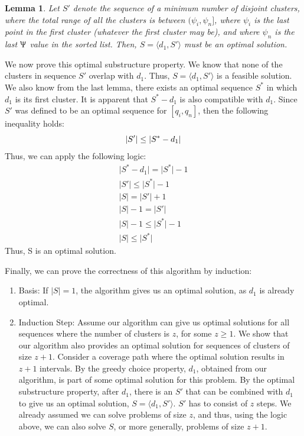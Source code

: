 \documentclass[conference]{IEEEtran}
\theoremstyle{plain}%
\newtheorem{lemma}{Lemma}
\begin{document}
\begin{lemma} %
Let $S'$ denote the sequence of a minimum number of disjoint clusters, where the total range of all the clusters is between $(\psi_i, \psi_n]$, where $\psi_i$ is the last point in the first cluster (whatever the first cluster may be), and where $\psi_n$ is the last $\Uppsi$ value in the sorted list. Then, $S = \langle d_1, S' \rangle$ must be an optimal solution.
\end{lemma}
We now prove this optimal substructure property. We know that none of the clusters in sequence $S'$ overlap with $d_1$. Thus, $S = \langle d_1, S' \rangle$ is a feasible solution. We also know from the last lemma, there exists an optimal sequence $S^*$ in which $d_1$ is its first cluster. It is apparent that $S^* - d_1$ is also compatible with $d_1$. Since $S'$ was defined to be an optimal sequence for $[q_i, q_n]$, then the following inequality holds:
\begin{equation*}
\lvert S' \rvert \leq \lvert S^* - d_1 \rvert \\
\end{equation*}
Thus, we can apply the following logic:
\begin{gather*}
\lvert S^* - d_1 \rvert = \lvert S^* \rvert -1 \\
\lvert S' \rvert \leq \lvert S^* \rvert -1 \\
\lvert S \rvert = \lvert S' \rvert + 1 \\
\lvert S \rvert -1 = \lvert S' \rvert \\
\lvert S \rvert -1 \leq \lvert S^* \rvert -1 \\
\lvert S \rvert \leq \lvert S^* \rvert 
\end{gather*}
Thus, S is an optimal solution.

Finally, we can prove the correctness of this algorithm by induction:
\begin{enumerate}
\item Basis: If $\lvert S \rvert = 1$, the algorithm gives us an optimal solution, as $d_1$ is already optimal.
\item Induction Step: Assume our algorithm can give us optimal solutions for all sequences where the number of clusters is $z$, for some $z \geq 1$. We show that our algorithm also provides an optimal solution for sequences of clusters of size $z+1$. Consider a coverage path where the optimal solution results in $z+1$ intervals. By the greedy choice property, $d_1$, obtained from our algorithm, is part of some optimal solution for this problem. By the optimal substructure property, after $d_1$, there is an $S'$ that can be combined with $d_1$ to give us an optimal solution, $S=\langle d_1, S' \rangle$. $S'$ has to consist of $z$ steps. We already assumed we can solve problems of size $z$, and thus, using the logic above, we can also solve $S$, or more generally, problems of size $z+1$.
\end{enumerate}
\end{document}
